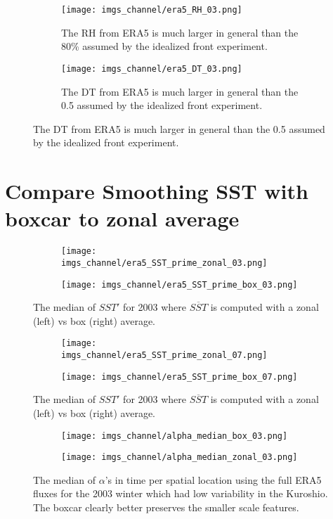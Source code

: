 \documentclass[12pt,a4paper]{article}
\begin{document}
\begin{figure}[h!]
\centering
\begin{subfigure}[t]{0.49\textwidth}
\texttt{[image: imgs\_channel/era5\_RH\_03.png]}
\caption{The RH from ERA5 is much larger in general than the 80\% assumed by the idealized front experiment.}
\end{subfigure}
\begin{subfigure}[t]{0.49\textwidth}
\texttt{[image: imgs\_channel/era5\_DT\_03.png]}
\caption{The DT from ERA5 is much larger in general than the 0.5 assumed by the idealized front experiment.}
\end{subfigure}

\end{figure}

\section{Compare Smoothing SST with boxcar to zonal average}

\begin{figure}[h!]
\centering
\begin{subfigure}[t]{0.49\textwidth}
\texttt{[image: imgs\_channel/era5\_SST\_prime\_zonal\_03.png]}
\end{subfigure}
\begin{subfigure}[t]{0.49\textwidth}
\texttt{[image: imgs\_channel/era5\_SST\_prime\_box\_03.png]}
\end{subfigure}
\caption{The median of $SST'$ for 2003 where $\overline{SST}$ is computed with a zonal (left) vs box (right) average.}
\end{figure}

\begin{figure}[h!]
\centering
\begin{subfigure}[t]{0.49\textwidth}
\texttt{[image: imgs\_channel/era5\_SST\_prime\_zonal\_07.png]}
\end{subfigure}
\begin{subfigure}[t]{0.49\textwidth}
\texttt{[image: imgs\_channel/era5\_SST\_prime\_box\_07.png]}
\end{subfigure}
\caption{The median of $SST'$ for 2003 where $\overline{SST}$ is computed with a zonal (left) vs box (right) average.}
\end{figure}



\begin{figure}[h!]
\centering
\begin{subfigure}[t]{\textwidth}
\texttt{[image: imgs\_channel/alpha\_median\_box\_03.png]}
\end{subfigure}
\begin{subfigure}[t]{\textwidth}
\texttt{[image: imgs\_channel/alpha\_median\_zonal\_03.png]}
\end{subfigure}
\caption{The median of $\alpha$'s in time per spatial location using the full ERA5 fluxes for the 2003 winter which had low variability in the Kuroshio. The boxcar clearly better preserves the smaller scale features.}
\end{figure}
\end{document}
